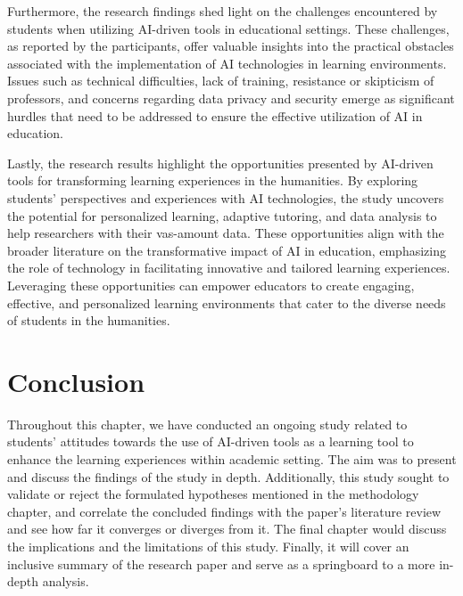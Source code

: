Furthermore, the research findings shed light on the challenges encountered by
students when utilizing AI-driven tools in educational settings. These challenges,
as reported by the participants, offer valuable insights into the practical obstacles
associated with the implementation of AI technologies in learning environments.
Issues such as technical difficulties, lack of training, resistance or skipticism of professors,
and concerns regarding data privacy and security emerge as significant
hurdles that need to be addressed to ensure the effective utilization of AI in education.


Lastly, the research results highlight the opportunities presented by AI-driven
tools for transforming learning experiences in the humanities. By exploring
students' perspectives and experiences with AI technologies, the study uncovers
the potential for personalized learning, adaptive tutoring, and data analysis to help researchers
with their vas-amount data. These opportunities align with the broader literature
on the transformative impact of AI in education, emphasizing the role of technology
in facilitating innovative and tailored learning experiences. Leveraging these
opportunities can empower educators to create engaging, effective, and personalized
learning environments that cater to the diverse needs of students in the humanities.


\section{Conclusion}
Throughout this chapter, we have conducted an ongoing study related to students’
attitudes towards the use of AI-driven tools as a learning tool to enhance the learning experiences
within academic setting. The aim was to present and discuss the findings of the study in depth.
Additionally, this study sought to validate or reject the formulated hypotheses mentioned
in the methodology chapter, and correlate the concluded findings with the paper’s literature
review and see how far it converges or diverges from it. The final chapter would discuss
the implications and the limitations of this study. Finally, it will cover an inclusive summary
of the research paper and serve as a springboard to a more in-depth analysis.
